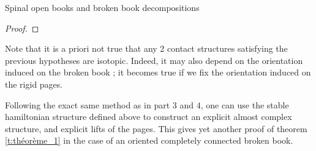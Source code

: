 \documentclass[../main.tex]{subfiles}
\begin{document}
\begin{section}{Spinal open books and broken book decompositions}
\begin{proof}
\end{proof}

\begin{remark}
Note that it is a priori not true that any 2 contact structures satisfying the previous hypotheses are isotopic. Indeed, it may also depend on the orientation induced on the broken book ; it becomes true if we fix the orientation induced on the rigid pages.
\end{remark}


\begin{remark}
Following the exact same method as in \cite{SOBD2} part $3$ and $4$, one can use the stable hamiltonian structure defined above to construct an explicit almost complex structure, and explicit lifts of the pages. This gives yet another proof of theorem \ref{t:théorème_1} in the case of an oriented completely connected broken book.
\end{remark}









\end{section}
\end{document}
